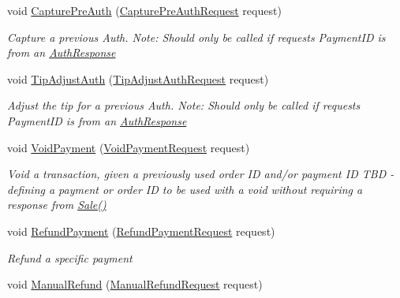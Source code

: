 \begin{DoxyCompactItemize}
void \hyperlink{classcom_1_1clover_1_1remotepay_1_1sdk_1_1_clover_connector_a7323abfe34b1fee5634dd7e1296633cb}{Capture\+Pre\+Auth} (\hyperlink{classcom_1_1clover_1_1remotepay_1_1sdk_1_1_capture_pre_auth_request}{Capture\+Pre\+Auth\+Request} request)
\begin{DoxyCompactList}\small\item\em Capture a previous Auth. Note\+: Should only be called if request\textquotesingle{}s Payment\+ID is from an \hyperlink{classcom_1_1clover_1_1remotepay_1_1sdk_1_1_auth_response}{Auth\+Response} \end{DoxyCompactList}\item 
void \hyperlink{classcom_1_1clover_1_1remotepay_1_1sdk_1_1_clover_connector_a84fa27d8c605594999b39e619b20359e}{Tip\+Adjust\+Auth} (\hyperlink{classcom_1_1clover_1_1remotepay_1_1sdk_1_1_tip_adjust_auth_request}{Tip\+Adjust\+Auth\+Request} request)
\begin{DoxyCompactList}\small\item\em Adjust the tip for a previous Auth. Note\+: Should only be called if request\textquotesingle{}s Payment\+ID is from an \hyperlink{classcom_1_1clover_1_1remotepay_1_1sdk_1_1_auth_response}{Auth\+Response} \end{DoxyCompactList}\item 
void \hyperlink{classcom_1_1clover_1_1remotepay_1_1sdk_1_1_clover_connector_aa987ae8606b8b2f4a235e9c09ffeef3b}{Void\+Payment} (\hyperlink{classcom_1_1clover_1_1remotepay_1_1sdk_1_1_void_payment_request}{Void\+Payment\+Request} request)
\begin{DoxyCompactList}\small\item\em Void a transaction, given a previously used order ID and/or payment ID T\+BD -\/ defining a payment or order ID to be used with a void without requiring a response from \hyperlink{classcom_1_1clover_1_1remotepay_1_1sdk_1_1_clover_connector_a1adbcc8a0d4aaa82157a102af4f16b91}{Sale()} \end{DoxyCompactList}\item 
void \hyperlink{classcom_1_1clover_1_1remotepay_1_1sdk_1_1_clover_connector_a55f368cbaa89e2a8c47da3ba4a3a80aa}{Refund\+Payment} (\hyperlink{classcom_1_1clover_1_1remotepay_1_1sdk_1_1_refund_payment_request}{Refund\+Payment\+Request} request)
\begin{DoxyCompactList}\small\item\em Refund a specific payment \end{DoxyCompactList}\item 
void \hyperlink{classcom_1_1clover_1_1remotepay_1_1sdk_1_1_clover_connector_a0ecc7e8c3333a05853297c46adc8822c}{Manual\+Refund} (\hyperlink{classcom_1_1clover_1_1remotepay_1_1sdk_1_1_manual_refund_request}{Manual\+Refund\+Request} request)

\end{DoxyCompactItemize}
